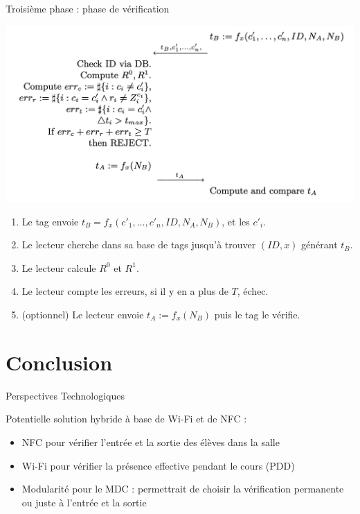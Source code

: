 \documentclass[aspectratio=169]{beamer}
\begin{document}
\begin{frame}{Troisième phase : phase de vérification}
  \begin{multicols}{2}
    \begin{minipage}[c]{\linewidth}
      \centering
      \bigskip
      \bigskip
      \bigskip
      \includegraphics[width=\linewidth]{../assets/sk-phase3.png}
    \end{minipage}

    \begin{minipage}[t]{\linewidth}
      \begin{enumerate}
        \item Le tag envoie $t_B = f_x(c'_1, \hdots, c'_n, ID, N_A, N_B)$, et les $c'_i$.
        \item Le lecteur cherche dans sa base de tags jusqu'à trouver $(ID, x)$ générant $t_B$.
        \item Le lecteur calcule $R^0$ et $R^1$.
        \item Le lecteur compte les erreurs, si il y en a plus de $T$, échec.
        \item (optionnel) Le lecteur envoie $t_A := f_x(N_B)$ puis le tag le vérifie.
      \end{enumerate}
    \end{minipage}
  \end{multicols}
\end{frame}

\section{Conclusion}

\begin{frame}{Perspectives Technologiques}

Potentielle solution hybride à base de Wi-Fi et de NFC :
\pause
\begin{itemize}
    \item NFC pour vérifier l'entrée et la sortie des élèves dans la salle
    \pause
    \item Wi-Fi pour vérifier la présence effective pendant le cours (PDD)
    \pause
    \item Modularité pour le MDC : permettrait de choisir la vérification permanente ou juste à l'entrée et la sortie
\end{itemize}

\end{frame}
\end{document}
